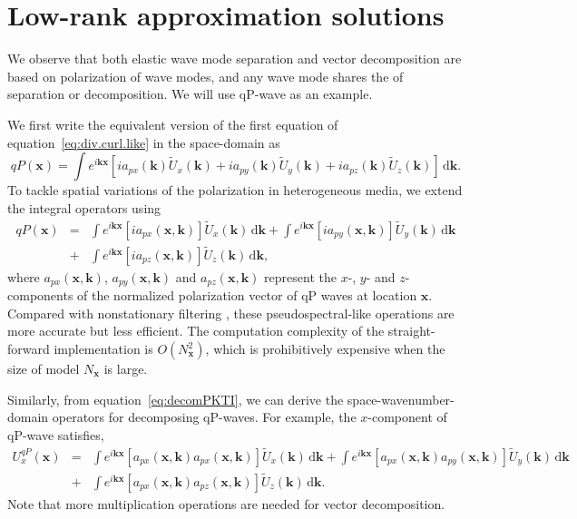 \section{Low-rank approximation solutions}
We observe that both elastic wave mode separation and vector decomposition are based on polarization of wave modes,
and any wave mode shares the  of separation or decomposition. We will use qP-wave as an example.

We first write the equivalent version of the first equation of equation~\ref{eq:div.curl.like} in the space-domain as
\begin{equation}
\label{eq:sepP}
qP(\mathbf{x})=\int{e^{i\mathbf{k}\mathbf{x}}
\left[ia_{px}(\mathbf{k})\tilde{U}_{x}(\mathbf{k})+ia_{py}(\mathbf{k})\tilde{U}_{y}(\mathbf{k})+ia_{pz}(\mathbf{k})\tilde{U}_{z}(\mathbf{k})\right]
}\,\mathrm{d}\mathbf{k}.
\end{equation}
To tackle spatial variations of the polarization in heterogeneous media, we extend the integral operators using
\begin{eqnarray}
\label{eq:sepPXK}
qP(\mathbf{x})&=& \int{ e^{i\mathbf{k}\mathbf{x}}\left[ia_{px}(\mathbf{x},\mathbf{k})\right] \tilde{U}_{x}(\mathbf{k}) }\,\mathrm{d}\mathbf{k} 
                + \int{ e^{i\mathbf{k}\mathbf{x}}\left[ia_{py}(\mathbf{x},\mathbf{k})\right] \tilde{U}_{y}(\mathbf{k}) }\,\mathrm{d}\mathbf{k} \nonumber \\
              &+& \int{ e^{i\mathbf{k}\mathbf{x}}\left[ia_{pz}(\mathbf{x},\mathbf{k})\right] \tilde{U}_{z}(\mathbf{k}) }\,\mathrm{d}\mathbf{k},
\end{eqnarray}
where $a_{px}(\mathbf{x},\mathbf{k})$, $a_{py}(\mathbf{x},\mathbf{k})$ and $a_{pz}(\mathbf{x},\mathbf{k})$ represent the $x$-, $y$- and $z$-components 
of the normalized polarization vector of qP waves at location $\mathbf{x}$.
Compared with nonstationary filtering \cite[]{yan.sava:2009}, these pseudospectral-like operations are more accurate but less efficient.
The computation complexity of the straight-forward implementation is $O(N_{\mathbf{x}}^2)$, which is prohibitively expensive when the size of model $N_{\mathbf{x}}$ is large.

Similarly, from equation~\ref{eq:decomPKTI}, we can derive the space-wavenumber-domain operators for decomposing qP-waves. For example, the $x$-component of qP-wave satisfies,
\begin{eqnarray}
\label{eq:decomPXK}
U_{x}^{qP}(\mathbf{x})&=&\int{e^{i\mathbf{k}\mathbf{x}}\left[a_{px}(\mathbf{x},\mathbf{k})a_{px}(\mathbf{x},\mathbf{k})\right]\tilde{U}_{x}(\mathbf{k})}\,\mathrm{d}\mathbf{k}
                        +\int{e^{i\mathbf{k}\mathbf{x}}\left[a_{px}(\mathbf{x},\mathbf{k})a_{py}(\mathbf{x},\mathbf{k})\right]\tilde{U}_{y}(\mathbf{k})}\,\mathrm{d}\mathbf{k} \nonumber \\
                      &+&\int{ e^{i\mathbf{k}\mathbf{x}}\left[a_{px}(\mathbf{x},\mathbf{k})a_{pz}(\mathbf{x},\mathbf{k})\right] \tilde{U}_{z}(\mathbf{k})}\,\mathrm{d}\mathbf{k}.
\end{eqnarray}
Note that more multiplication operations are needed for vector decomposition.

